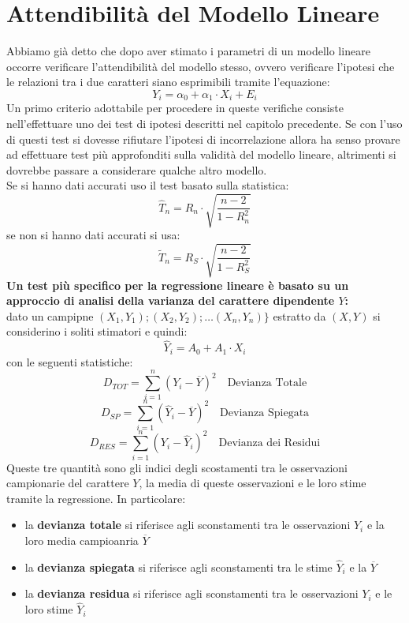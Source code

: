 \documentclass[a4paper,12pt, oneside]{book}
\begin{document}
\section{Attendibilità del Modello Lineare}
Abbiamo già detto che dopo aver stimato i parametri di un modello lineare occorre
verificare l'attendibilità del modello stesso, ovvero verificare l'ipotesi che le relazioni
tra i due caratteri siano esprimibili tramite l'equazione:
\[Y_{i}=\alpha_{0}+\alpha_{1} \cdot X_{i}+E_{i}\]
Un primo criterio adottabile per procedere in queste verifiche consiste
nell'effettuare uno dei test di ipotesi descritti nel capitolo precedente. Se con l'uso di questi test si dovesse rifiutare l'ipotesi di incorrelazione allora ha
senso provare ad effettuare test più approfonditi sulla validità del modello lineare,
altrimenti si dovrebbe passare a considerare qualche altro modello.\\
Se si hanno dati accurati uso il test basato sulla statistica:
\[\hat{T}_{n}=R_{n} \cdot \sqrt{\frac{n-2}{1-R_{n}^{2}}}\]
se non si hanno dati accurati si usa:
\[\tilde{T}_{n}=R_{S} \cdot \sqrt{\frac{n-2}{1-R_{S}^{2}}}\]
\textbf{Un test più specifico per la regressione lineare è basato su un approccio di analisi della varianza
  del carattere dipendente $Y$:}\\
dato un campipne $\left(X_{1}, Y_{1}\right) ;\left(X_{2}, Y_{2}\right) ; \ldots\left(X_{n}, Y_{n}\right) \}$ estratto da $(X,Y)$
si considerino i soliti stimatori e quindi:
\[\hat{Y}_{i}=A_{0}+A_{1} \cdot X_{i}\]
con le seguenti statistiche:
\[D_{T O T}=\sum_{i=1}^{n}\left(Y_{i}-\overline{Y}\right)^{2} \quad \text{Devianza Totale}\]
\[D_{S P}=\sum_{i=1}^{n}\left(\hat{Y}_{i}-\overline{Y}\right)^{2} \quad \text{Devianza Spiegata}\]
\[D_{R E S}=\sum_{i=1}^{n}\left(Y_{i}-\hat{Y}_{i}\right)^{2} \quad \text{Devianza dei Residui}\]
Queste tre quantità sono gli indici degli scostamenti tra le osservazioni campionarie
del carattere $Y$, la media di queste osservazioni e le loro stime tramite la regressione. In particolare:
\begin{itemize}
\item la \textbf{devianza totale} si riferisce agli sconstamenti tra le osservazioni $Y_i$ e la loro media campioanria $\overline{Y}$
\item la \textbf{devianza spiegata} si riferisce agli sconstamenti tra le stime $\hat{Y}_i$ e la $\overline{Y}$
\item la \textbf{devianza residua} si riferisce agli sconstamenti tra le osservazioni $Y_i$ e le loro stime $\hat{Y}_i$
\end{itemize}
\end{document}
